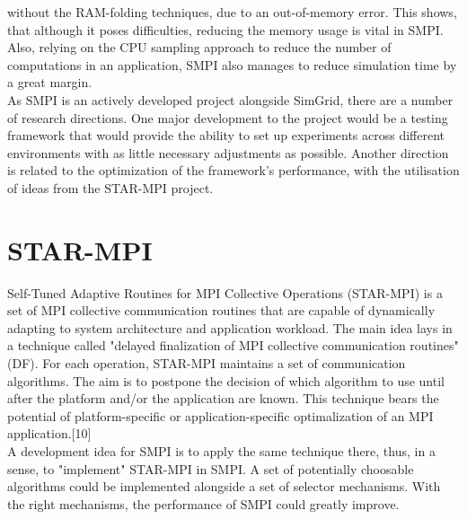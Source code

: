 \documentclass[a4paper]{article}
\begin{document}
without the RAM-folding techniques, due to an out-of-memory
error. This shows, that although it poses difficulties, reducing the
memory usage is vital in SMPI. Also, relying on the CPU sampling
approach to reduce the number of computations in an application, SMPI
also manages to reduce simulation time by a great margin.\\
As SMPI is an actively developed project alongside SimGrid, there are
a number of research directions. One major development to the
project would be a testing framework that would provide the ability to
set up experiments across different environments with as little
necessary adjustments as possible. Another direction is related to the
optimization of the framework's performance, with the utilisation of
ideas from the STAR-MPI project.
\section{STAR-MPI}
Self-Tuned Adaptive Routines for MPI Collective Operations (STAR-MPI)
is a set of MPI collective communication routines that are capable of
dynamically adapting to system architecture and application
workload. The main idea lays in a technique called "delayed
finalization of MPI collective communication routines" (DF). For each
operation, STAR-MPI maintains a set of communication algorithms. The
aim is to postpone the decision of which algorithm to use until after
the platform and/or the application are known. This technique bears
the potential of platform-specific or application-specific
optimalization of an MPI application.[10]\\
A development idea for SMPI is to apply the same technique there,
thus, in a sense, to "implement" STAR-MPI in SMPI. A set of
potentially choosable algorithms could be implemented alongside a set
of selector mechanisms. With the right mechanisms, the performance of
SMPI could greatly improve.
\clearpage
\end{document}

